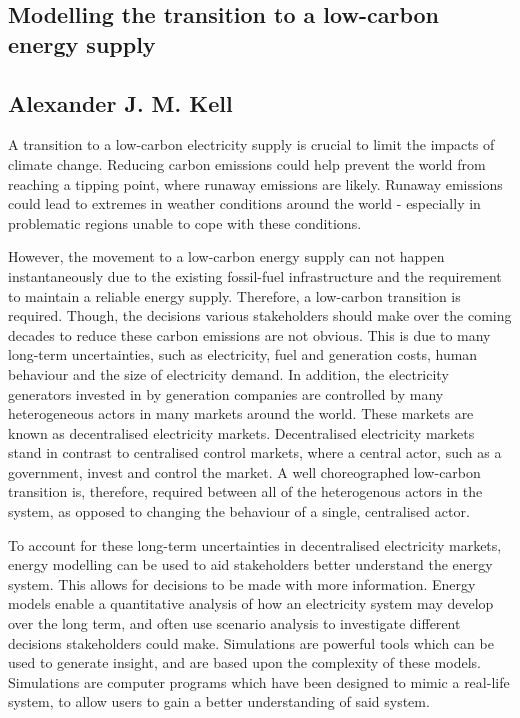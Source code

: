 \documentclass[11pt]{report}
\begin{document}
\begin{center}
	

\section*{Modelling the transition to a low-carbon energy supply}
\subsection*{Alexander J. M. Kell}
\end{center}

A transition to a low-carbon electricity supply is crucial to limit the impacts of climate change. Reducing carbon emissions could help prevent the world from reaching a tipping point, where runaway emissions are likely. Runaway emissions could lead to extremes in weather conditions around the world - especially in problematic regions unable to cope with these conditions. 



However, the movement to a low-carbon energy supply can not happen instantaneously due to the existing fossil-fuel infrastructure and the requirement to maintain a reliable energy supply. Therefore, a low-carbon transition is required. Though, the decisions various stakeholders should make over the coming decades to reduce these carbon emissions are not obvious. This is due to many long-term uncertainties, such as electricity, fuel and generation costs, human behaviour and the size of electricity demand. In addition, the electricity generators invested in by generation companies are controlled by many heterogeneous actors in many markets around the world. These markets are known as decentralised electricity markets. Decentralised electricity markets stand in contrast to centralised control markets, where a central actor, such as a government, invest and control the market. A well choreographed low-carbon transition is, therefore, required between all of the heterogenous actors in the system, as opposed to changing the behaviour of a single, centralised actor.

To account for these long-term uncertainties in decentralised electricity markets, energy modelling can be used to aid stakeholders better understand the energy system. This allows for decisions to be made with more information. Energy models enable a quantitative analysis of how an electricity system may develop over the long term, and often use scenario analysis to investigate different decisions stakeholders could make. Simulations are powerful tools which can be used to generate insight, and are based upon the complexity of these models. Simulations are computer programs which have been designed to mimic a real-life system, to allow users to gain a better understanding of said system.
\end{document}
